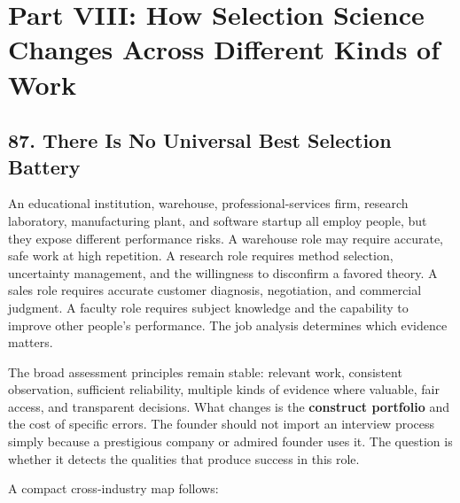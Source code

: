 \section*{Part VIII: How Selection Science Changes Across Different Kinds of Work}

\subsection*{87. There Is No Universal Best Selection Battery}

An educational institution, warehouse, professional-services firm, research laboratory, manufacturing plant, and software startup all employ people, but they expose different performance risks. A warehouse role may require accurate, safe work at high repetition. A research role requires method selection, uncertainty management, and the willingness to disconfirm a favored theory. A sales role requires accurate customer diagnosis, negotiation, and commercial judgment. A faculty role requires subject knowledge and the capability to improve other people's performance. The job analysis determines which evidence matters.

The broad assessment principles remain stable: relevant work, consistent observation, sufficient reliability, multiple kinds of evidence where valuable, fair access, and transparent decisions. What changes is the \textbf{construct portfolio} and the cost of specific errors. The founder should not import an interview process simply because a prestigious company or admired founder uses it. The question is whether it detects the qualities that produce success in this role.

A compact cross-industry map follows:

